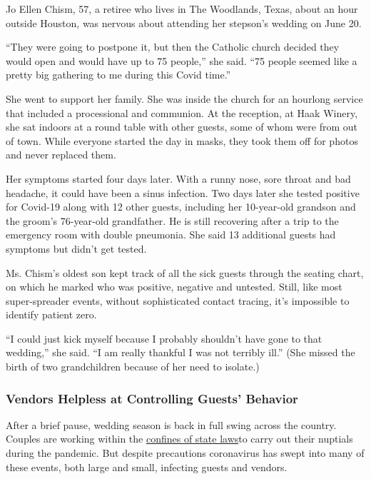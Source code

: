 Jo Ellen Chism, 57, a retiree who lives in The Woodlands, Texas, about
an hour outside Houston, was nervous about attending her stepson's
wedding on June 20.

``They were going to postpone it, but then the Catholic church decided
they would open and would have up to 75 people,'' she said. ``75 people
seemed like a pretty big gathering to me during this Covid time.''

She went to support her family. She was inside the church for an
hourlong service that included a processional and communion. At the
reception, at Haak Winery, she sat indoors at a round table with other
guests, some of whom were from out of town. While everyone started the
day in masks, they took them off for photos and never replaced them.

Her symptoms started four days later. With a runny nose, sore throat and
bad headache, it could have been a sinus infection. Two days later she
tested positive for Covid-19 along with 12 other guests, including her
10-year-old grandson and the groom's 76-year-old grandfather. He is
still recovering after a trip to the emergency room with double
pneumonia. She said 13 additional guests had symptoms but didn't get
tested.

Ms. Chism's oldest son kept track of all the sick guests through the
seating chart, on which he marked who was positive, negative and
untested. Still, like most super-spreader events, without sophisticated
contact tracing, it's impossible to identify patient zero.

``I could just kick myself because I probably shouldn't have gone to
that wedding,'' she said. ``I am really thankful I was not terribly
ill.'' (She missed the birth of two grandchildren because of her need to
isolate.)

\hypertarget{vendors-helpless-at-controlling-guests-behavior}{%
\subsubsection{Vendors Helpless at Controlling Guests'
Behavior}\label{vendors-helpless-at-controlling-guests-behavior}}

After a brief pause, wedding season is back in full swing across the
country. Couples are working within the
\href{https://web.csg.org/covid19/state-reopen-plans/}{confines of state
laws}to carry out their nuptials during the pandemic. But despite
precautions coronavirus has swept into many of these events, both large
and small, infecting guests and vendors.

